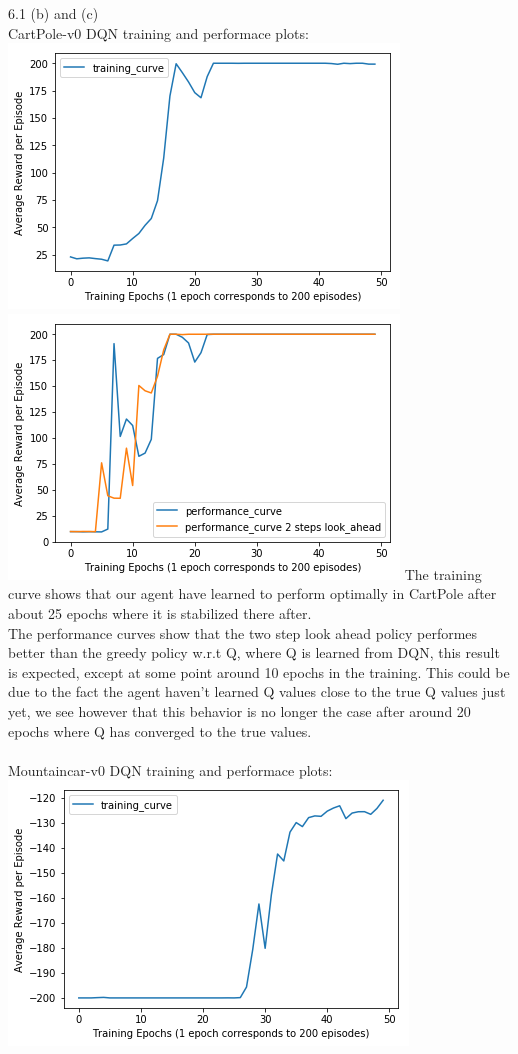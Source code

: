 \documentclass[12pt]{article}
\begin{document}
    \begin{tcolorbox}[fit,height=22cm, width=\textwidth, blank, borderline={1pt}{-2pt},nobeforeafter]
    {\large 6.1 (b) and (c)} \\
    {\large CartPole-v0 DQN training and performace plots:} \\
    \includegraphics[width=.5\textwidth]{figures/CP_dqn_training_curve}
    \includegraphics[width=.5\textwidth]{figures/CP_dqn_performance_curve}
    The training curve shows that our agent have learned to perform optimally in CartPole after about 25 epochs where it is stabilized there after. \\
    The performance curves show that the two step look ahead policy performes better than the greedy policy w.r.t Q, where Q is learned from DQN, this result is expected, except at some point around 10 epochs in the training. This could be due to the fact the agent haven't learned Q values close to the true Q values just yet, we see however that this behavior is no longer the case after around 20 epochs where Q has converged to the true values.\\
    \\
    {\large Mountaincar-v0 DQN training and performace plots:} \\
    \includegraphics[width=.5\textwidth]{figures/MC_dqn_training_curve}

\end{tcolorbox}
\end{document}
